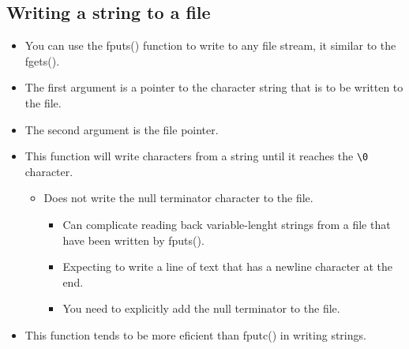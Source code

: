 \subsection{Writing a string to a file}
\begin{itemize}
    \item You can use the fputs() function to write to any file stream, it similar to the fgets().
    
    \item The first argument is a pointer to the character string that is to be written to the file.
    \item The second argument is the file pointer.
    \item This function will write characters from a string until it reaches the \verb|\0| character.
        \begin{itemize}
            \item Does not write the null terminator character to the file.
                \begin{itemize}
                    \item Can complicate reading back variable-lenght strings from a file that have been written by fputs().
                    \item Expecting to write a line of text that has a newline character at the end. 
                    \item You need to explicitly add the null terminator to the file.
                \end{itemize}
        \end{itemize}
    
    \item This function tends to be more eficient than fputc() in writing strings.
\end{itemize}

